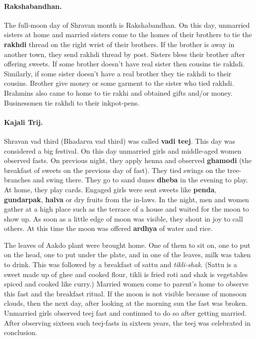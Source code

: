 \paragraph{Rakshabandhan.} The full-moon day of Shravan
month is Rakshabandhan.  On this day, unmarried sisters at home and married
sisters come to the homes of their brothers to tie the \textbf{rakhdi}
thread on the right wrist of their brothers. If the brother is away in another
town, they send rakhdi thread by post. Sisters bless their
brother after offering sweets. If some brother doesn't have real sister then
cousins tie rakhdi. Similarly, if some sister doesn't have a real
brother they tie rakhdi to their cousins. Brother give money or
some garment to the sister who tied rakhdi. Brahmins also came to home to tie rakhi
and obtained gifts and/or money. Businessmen tie rakhdi to their
inkpot-pens.
\paragraph{Kajali Trij.} Shravan vad third (Bhadarva vad third)
was called \textbf{vadi teej}. This day was considered a big festival. On this
day unmarried girls and middle-aged women observed fasts. On previous
night, they apply henna and observed \textbf{ghamodi} (the breakfast of
sweets on the previous day of fast). They tied swings on the tree-branches and
swing there. They go to sand dunes \textbf{dheba} in the evening
to play. At home, they play cards. Engaged girls were sent sweets like
\textbf{penda}, \textbf{gundarpak}, \textbf{halva} or dry fruits from the
in-laws. In the night, men and women gather at a high place such as the
terrace of a house and waited for the moon to show up. As soon as a little edge
of moon was visible, they shout in joy to call others. At this time the
moon was offered \textbf{ardhya} of water and rice.

The leaves of Aakdo plant were brought home. One of them to sit on, one to put
on the head, one to put under the plate, and in one of the leaves, milk was
taken to drink. This was followed by a breakfast of sattu and \textit{tikli-shak}. (Sattu
is a sweet made up of ghee and cooked flour, tikli is fried roti and shak is
vegetables spiced and cooked like curry.) Married women come to parent's home to
observe this fast and the breakfast ritual. If the moon is not visible because
of monsoon clouds, then the next day, after looking at the morning sun the fast
was broken. Unmarried girls observed teej fast and continued to do so after
getting married. After observing sixteen such teej-fasts in sixteen years, the
teej was celebrated in conclusion.
